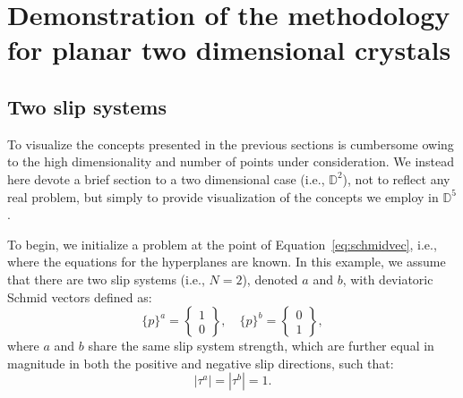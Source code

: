 \documentclass[preprint,3p,times,sort&compress,letterpaper,12pt]{elsarticle} %
\begin{document}
\section{Demonstration of the methodology for planar two dimensional crystals}
\label{sec:demonstration}

\subsection{Two slip systems}
\label{subsubsec:two_slip_systems}

To visualize the concepts presented in the previous sections is cumbersome owing to the high dimensionality and number of points under consideration. We instead here devote a brief section to a two dimensional case (i.e., $\mathbb{D}^2$), not to reflect any real problem, but simply to provide visualization of the concepts we employ in $\mathbb{D}^5$.

To begin, we initialize a problem at the point of Equation~\ref{eq:schmidvec}, i.e., where the equations for the hyperplanes are known. In this example, we assume that there are two slip systems (i.e., $N=2$), denoted $a$ and $b$, with deviatoric Schmid vectors defined as:
\begin{equation}
    \{p\}^{a} = \begin{Bmatrix}
        1 \\
        0
    \end{Bmatrix},
    \quad
    \{p\}^{b} = \begin{Bmatrix}
        0 \\
        1
    \end{Bmatrix},
\end{equation}
where $a$ and $b$ share the same slip system strength, which are further equal in magnitude in both the positive and negative slip directions, such that:
\begin{equation}
    \left|\tau^a\right|=\left|\tau^b\right|=1.
\end{equation}
\end{document}
